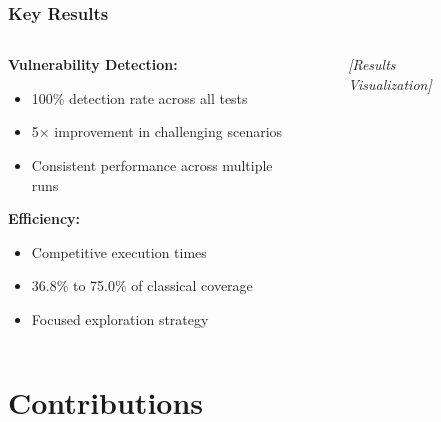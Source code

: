 \documentclass[aspectratio=169]{beamer}
\begin{document}
\begin{frame}
    \frametitle{Key Results}
    \begin{columns}
        \begin{column}{0.5\textwidth}
            \textbf{Vulnerability Detection:}
            \begin{itemize}
                \item 100\% detection rate across all tests
                \item 5× improvement in challenging scenarios
                \item Consistent performance across multiple runs
            \end{itemize}
            
            \vspace{1em}
            \textbf{Efficiency:}
            \begin{itemize}
                \item Competitive execution times
                \item 36.8\% to 75.0\% of classical coverage
                \item Focused exploration strategy
            \end{itemize}
        \end{column}
        \begin{column}{0.5\textwidth}
            \begin{figure}[H]
                \centering
                \textit{[Results Visualization]}
            \end{figure}
        \end{column}
    \end{columns}
\end{frame}

\section{Contributions}
\end{document}
